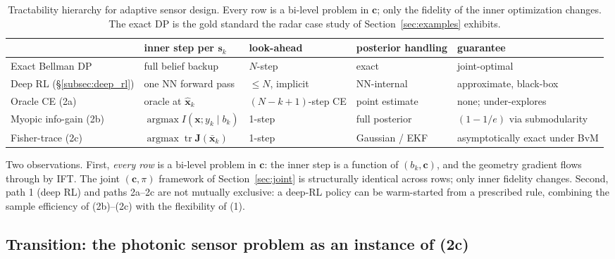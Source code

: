 \documentclass[11pt,a4paper]{article}
\newcommand{\tr}{\operatorname{tr}}
\newcommand{\argmax}{\operatorname{argmax}}
\begin{document}
\begin{table}[h]
\centering
\caption{Tractability hierarchy for adaptive sensor design.  Every row is a bi-level problem in $\bm{c}$; only the fidelity of the inner optimization changes.  The exact DP is the gold standard the radar case study of Section~\ref{sec:examples} exhibits.}
\label{tab:hierarchy}
\small
\begin{tabular}{@{}lp{3.4cm}p{2.5cm}p{3.1cm}p{2.5cm}@{}}
\toprule
& inner step per $\bm{s}_k$ & look-ahead & posterior handling & guarantee \\
\midrule
Exact Bellman DP & full belief backup & $N$-step & exact & joint-optimal \\
Deep RL (\S\ref{subsec:deep_rl}) & one NN forward pass & $\le N$, implicit & NN-internal & approximate, black-box \\
Oracle CE (2a) & oracle at $\hat{\bm{x}}_k$ & $(N{-}k{+}1)$-step CE & point estimate & none; under-explores \\
Myopic info-gain (2b) & $\argmax I(\bm{x}; y_k\mid b_k)$ & 1-step & full posterior & $(1-1/e)$ via submodularity \\
Fisher-trace (2c) & $\argmax \tr\bm{J}(\bar{\bm{x}}_k)$ & 1-step & Gaussian / EKF & asymptotically exact under BvM \\
\bottomrule
\end{tabular}
\end{table}

Two observations.  First, \emph{every row} is a bi-level problem in $\bm{c}$: the inner step is a function of $(b_k, \bm{c})$, and the geometry gradient flows through by IFT.  The joint $(\bm{c}, \pi)$ framework of Section~\ref{sec:joint} is structurally identical across rows; only inner fidelity changes.  Second, path 1 (deep RL) and paths 2a--2c are not mutually exclusive: a deep-RL policy can be warm-started from a prescribed rule, combining the sample efficiency of (2b)--(2c) with the flexibility of (1).

\subsection{Transition: the photonic sensor problem as an instance of (2c)}
\label{subsec:transition_photonic}
\end{document}
